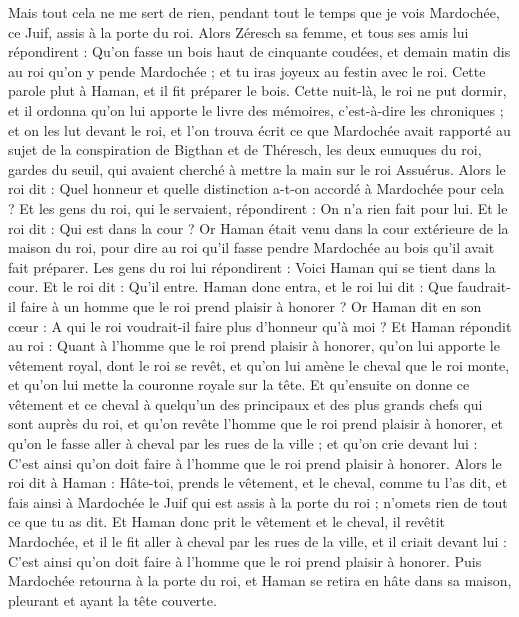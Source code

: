 \begin{multicols}{2}
Mais tout cela ne me sert de rien, pendant tout le temps que je vois Mardochée, ce Juif, assis à la porte du roi.
Alors Zéresch sa femme, et tous ses amis lui répondirent : Qu'on fasse un bois haut de cinquante coudées, et demain matin dis au roi qu'on y pende Mardochée ; et tu iras joyeux au festin avec le roi. Cette parole plut à Haman, et il fit préparer le bois.
\VerseOne{}Cette nuit-là, le roi ne put dormir, et il ordonna qu'on lui apporte le livre des mémoires, c'est-à-dire les chroniques ; et on les lut devant le roi,
et l’on trouva écrit ce que Mardochée avait rapporté au sujet de la conspiration de Bigthan et de Théresch, les deux eunuques du roi, gardes du seuil, qui avaient cherché à mettre la main sur le roi Assuérus.
Alors le roi dit : Quel honneur et quelle distinction a-t-on accordé à Mardochée pour cela ? Et les gens du roi, qui le servaient, répondirent : On n’a rien fait pour lui.
Et le roi dit : Qui est dans la cour ? Or Haman était venu dans la cour extérieure de la maison du roi, pour dire au roi qu'il fasse pendre Mardochée au bois qu'il avait fait préparer.
Les gens du roi lui répondirent : Voici Haman qui se tient dans la cour. Et le roi dit : Qu'il entre.
Haman donc entra, et le roi lui dit : Que faudrait-il faire à un homme que le roi prend plaisir à honorer ? Or Haman dit en son cœur : A qui le roi voudrait-il faire plus d'honneur qu’à moi ?
Et Haman répondit au roi : Quant à l’homme que le roi prend plaisir à honorer,
qu’on lui apporte le vêtement royal, dont le roi se revêt, et qu'on lui amène le cheval que le roi monte, et qu'on lui mette la couronne royale sur la tête.
Et qu'ensuite on donne ce vêtement et ce cheval à quelqu'un des principaux et des plus grands chefs qui sont auprès du roi, et qu'on revête l'homme que le roi prend plaisir à honorer, et qu'on le fasse aller à cheval par les rues de la ville ; et qu'on crie devant lui : C'est ainsi qu'on doit faire à l'homme que le roi prend plaisir à honorer.
Alors le roi dit à Haman : Hâte-toi, prends le vêtement, et le cheval, comme tu l’as dit, et fais ainsi à Mardochée le Juif qui est assis à la porte du roi ; n’omets rien de tout ce que tu as dit.
Et Haman donc prit le vêtement et le cheval, il revêtit Mardochée, et il le fit aller à cheval par les rues de la ville, et il criait devant lui : C’est ainsi qu’on doit faire à l’homme que le roi prend plaisir à honorer.
Puis Mardochée retourna à la porte du roi, et Haman se retira en hâte dans sa maison, pleurant et ayant la tête couverte.

\end{multicols}
